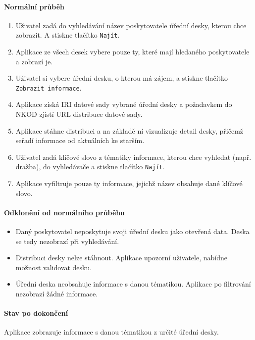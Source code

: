 \paragraph{Normální průběh}
\begin{enumerate}
    \item Uživatel zadá do vyhledávání název poskytovatele úřední desky, kterou chce zobrazit. A stiskne tlačítko \texttt{Najít}.
    \item Aplikace ze všech desek vybere pouze ty, které mají hledaného poskytovatele a zobrazí je.
    \item Uživatel si vybere úřední desku, o kterou má zájem, a stiskne tlačítko \texttt{Zobrazit informace}.
    \item Aplikace získá IRI datové sady vybrané úřední desky a požadavkem do NKOD zjistí URL distribuce datové sady.
    \item Aplikace stáhne distribuci a na základě ní vizualizuje detail desky, přičemž seřadí informace od aktuálních ke starším.
    \item Uživatel zadá klíčové slovo z tématiky informace, kterou chce vyhledat (např. dražba), do vyhledávače a stiskne tlačítko \texttt{Najít}.
    \item Aplikace vyfiltruje pouze ty informace, jejichž název obsahuje dané klíčové slovo.
\end{enumerate}

\paragraph{Odklonění od normálního průběhu}
\begin{itemize}
    \item Daný poskytovatel neposkytuje svoji úřední desku jako otevřená data. Des\-ka se tedy nezobrazí při vyhledávání.
    \item Distribuci desky nelze stáhnout. Aplikace upozorní uživatele, nabídne možnost validovat desku.
    \item Úřední deska neobsahuje informace s danou tématikou. Aplikace po filtrování nezobrazí žádné informace.
\end{itemize}

\paragraph{Stav po dokončení}
Aplikace zobrazuje informace s danou tématikou z určité úřední desky.


